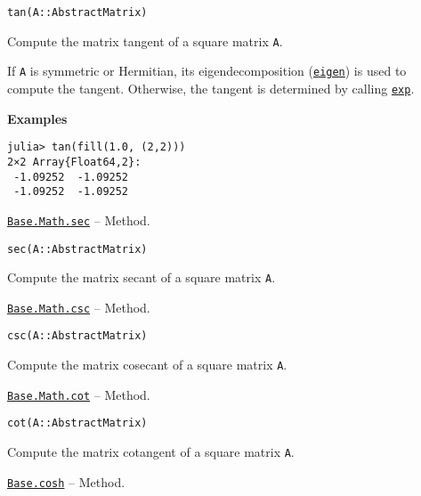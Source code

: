 \begin{adjustwidth}{2em}{0pt}


\begin{verbatim}
tan(A::AbstractMatrix)
\end{verbatim}

Compute the matrix tangent of a square matrix \texttt{A}.

If \texttt{A} is symmetric or Hermitian, its eigendecomposition (\hyperlink{11056016707394839114}{\texttt{eigen}}) is used to compute the tangent. Otherwise, the tangent is determined by calling \hyperlink{5801729597955756107}{\texttt{exp}}.

\textbf{Examples}


\begin{verbatim}
julia> tan(fill(1.0, (2,2)))
2×2 Array{Float64,2}:
 -1.09252  -1.09252
 -1.09252  -1.09252
\end{verbatim}



\end{adjustwidth}
\hypertarget{2627941190173499283}{} 
\hyperlink{2627941190173499283}{\texttt{Base.Math.sec}}  -- {Method.}

\begin{adjustwidth}{2em}{0pt}


\begin{verbatim}
sec(A::AbstractMatrix)
\end{verbatim}

Compute the matrix secant of a square matrix \texttt{A}.



\end{adjustwidth}
\hypertarget{14836994396551644362}{} 
\hyperlink{14836994396551644362}{\texttt{Base.Math.csc}}  -- {Method.}

\begin{adjustwidth}{2em}{0pt}


\begin{verbatim}
csc(A::AbstractMatrix)
\end{verbatim}

Compute the matrix cosecant of a square matrix \texttt{A}.



\end{adjustwidth}
\hypertarget{3756551817451989074}{} 
\hyperlink{3756551817451989074}{\texttt{Base.Math.cot}}  -- {Method.}

\begin{adjustwidth}{2em}{0pt}


\begin{verbatim}
cot(A::AbstractMatrix)
\end{verbatim}

Compute the matrix cotangent of a square matrix \texttt{A}.



\end{adjustwidth}
\hypertarget{3831542837693533832}{} 
\hyperlink{3831542837693533832}{\texttt{Base.cosh}}  -- {Method.}

